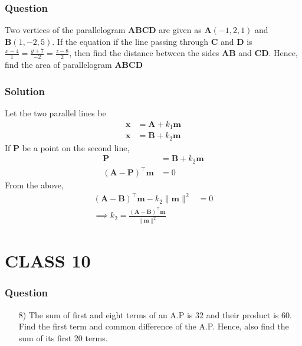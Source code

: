 \documentclass{beamer}
\providecommand{\brak}[1]{\ensuremath{\left(#1\right)}}
\theoremstyle{remark}
\providecommand{\norm}[1]{\lVert#1\rVert}
\let\vec\mathbf
\begin{document}
\begin{frame}
\frametitle{Question }
Two vertices of the parallelogram $\vec{ABCD}$ are given as $\vec{A}\brak{-1,2,1}$ and $\vec{B}\brak{1,-2,5}$. If the equation if the line passing through $\vec{C}$ and $\vec{D}$ is $\frac{x-4}{1} = \frac{y+7}{-2} = \frac{z-8}{2}$, then find the distance between the sides $\vec{AB}$ and $\vec{CD}$. Hence, find the area of parallelogram $\vec{ABCD}$
\end{frame}
%
\begin{frame}
\frametitle{Solution}
Let  the two parallel lines be
\begin{align}
    \vec{x} & = \vec{A} + k_1\vec{m}  \\
    \vec{x} &=  \vec{B} + k_2\vec{m} 
\end{align}
If $\vec{P}$ be a point on the second line, 
\begin{align}
    \vec{P} &=  \vec{B} + k_2\vec{m} 
    \\
	\brak{\vec{A}-\vec{P}}^{\top}\vec{m} &= 0
\end{align}
From the above, 
\begin{align}
	\brak{\vec{A}-\vec{B}}^{\top}\vec{m} -k_2\norm{\vec{m}}^2&= 0
	\\
	\implies k_2 = \frac{
		\brak{\vec{A}-\vec{B}}^{\top}\vec{m}}{ \norm{\vec{m}}^2}
\end{align}
    
\end{frame}








    \section{CLASS 10}






\begin{frame}
\frametitle{Question }
\begin{enumerate}
    \item [8)]
The sum of first and eight terms of an A.P is $32$ and their product is $60$. Find the first term and common difference of the A.P. Hence, also find the sum of its first $20$ terms. 
\end{enumerate}
\end{frame}
\end{document}
